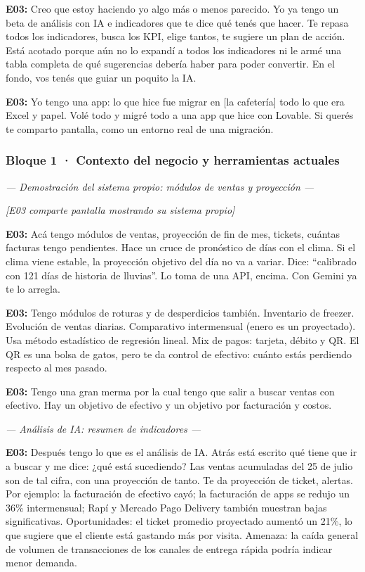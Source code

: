 \noindent\textbf{E03:} Creo que estoy haciendo yo algo más o menos parecido. Yo ya tengo un beta de análisis con IA e indicadores que te dice qué tenés que hacer. Te repasa todos los indicadores, busca los KPI, elige tantos, te sugiere un plan de acción. Está acotado porque aún no lo expandí a todos los indicadores ni le armé una tabla completa de qué sugerencias debería haber para poder convertir. En el fondo, vos tenés que guiar un poquito la IA.

\noindent\textbf{E03:} Yo tengo una app: lo que hice fue migrar en [la cafetería] todo lo que era Excel y papel. Volé todo y migré todo a una app que hice con Lovable. Si querés te comparto pantalla, como un entorno real de una migración.

\subsubsection*{Bloque 1 · Contexto del negocio y herramientas actuales}

\noindent\textit{--- Demostración del sistema propio: módulos de ventas y proyección ---}

\noindent\textit{[E03 comparte pantalla mostrando su sistema propio]}

\noindent\textbf{E03:} Acá tengo módulos de ventas, proyección de fin de mes, tickets, cuántas facturas tengo pendientes. Hace un cruce de pronóstico de días con el clima. Si el clima viene estable, la proyección objetivo del día no va a variar. Dice: ``calibrado con 121 días de historia de lluvias''. Lo toma de una API, encima. Con Gemini ya te lo arregla.

\noindent\textbf{E03:} Tengo módulos de roturas y de desperdicios también. Inventario de freezer. Evolución de ventas diarias. Comparativo intermensual (enero es un proyectado). Usa método estadístico de regresión lineal. Mix de pagos: tarjeta, débito y QR. El QR es una bolsa de gatos, pero te da control de efectivo: cuánto estás perdiendo respecto al mes pasado.

\noindent\textbf{E03:} Tengo una gran merma por la cual tengo que salir a buscar ventas con efectivo. Hay un objetivo de efectivo y un objetivo por facturación y costos.

\noindent\textit{--- Análisis de IA: resumen de indicadores ---}

\noindent\textbf{E03:} Después tengo lo que es el análisis de IA. Atrás está escrito qué tiene que ir a buscar y me dice: ¿qué está sucediendo? Las ventas acumuladas del 25 de julio son de tal cifra, con una proyección de tanto. Te da proyección de ticket, alertas. Por ejemplo: la facturación de efectivo cayó; la facturación de apps se redujo un 36\% intermensual; Rapí y Mercado Pago Delivery también muestran bajas significativas. Oportunidades: el ticket promedio proyectado aumentó un 21\%, lo que sugiere que el cliente está gastando más por visita. Amenaza: la caída general de volumen de transacciones de los canales de entrega rápida podría indicar menor demanda.

